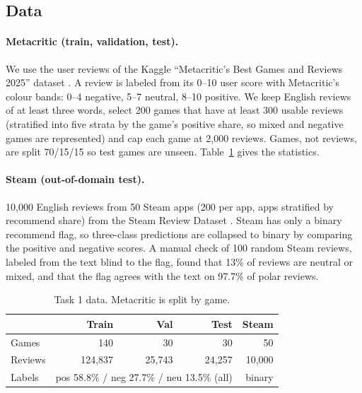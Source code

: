 \documentclass[11pt,a4paper]{article}
\begin{document}
\subsection{Data}

\paragraph{Metacritic (train, validation, test).} We use the user reviews of the Kaggle
``Metacritic's Best Games and Reviews 2025'' dataset \citep{metacritic2025kaggle}. A review is
labeled from its 0--10 user score with Metacritic's colour bands: 0--4 negative, 5--7 neutral,
8--10 positive. We keep English reviews of at least three words, select 200 games that have at
least 300 usable reviews (stratified into five strata by the game's positive share, so mixed
and negative games are represented) and cap each game at 2,000 reviews. Games, not reviews, are
split 70/15/15 so test games are unseen. Table~\ref{tab:t1data} gives the statistics.

\paragraph{Steam (out-of-domain test).} 10,000 English reviews from 50 Steam apps (200 per
app, apps stratified by recommend share) from the Steam Review Dataset
\citep{sobkowicz2017steam}. Steam has only a binary recommend flag, so three-class predictions
are collapsed to binary by comparing the positive and negative scores. A manual check of 100
random Steam reviews, labeled from the text blind to the flag, found that 13\% of reviews are
neutral or mixed, and that the flag agrees with the text on 97.7\% of polar reviews.

\begin{table}[t]
  \centering
  \small
  \begin{tabular}{lrrrr}
    \toprule
    & Train & Val & Test & Steam \\
    \midrule
    Games & 140 & 30 & 30 & 50 \\
    Reviews & 124,837 & 25,743 & 24,257 & 10,000 \\
    Labels & \multicolumn{3}{c}{pos 58.8\% / neg 27.7\% / neu 13.5\% (all)} & binary \\
    \bottomrule
  \end{tabular}
  \caption{Task 1 data. Metacritic is split by game.}
  \label{tab:t1data}
\end{table}
\end{document}
